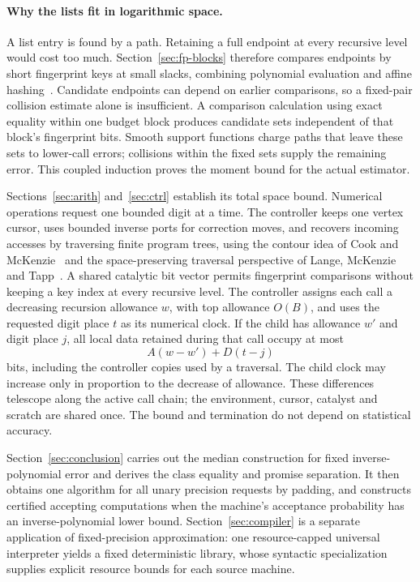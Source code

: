 \paragraph{Why the lists fit in logarithmic space.}
A list entry is found by a path.  Retaining a full endpoint at every
recursive level would cost too much.  Section~\ref{sec:fp-blocks}
therefore compares endpoints by short fingerprint keys at small slacks,
combining polynomial
evaluation and affine hashing~\cite{Schwartz1980,CarterWegman1979}.
Candidate endpoints
can depend on earlier comparisons, so a fixed-pair collision estimate
alone is insufficient.  A comparison calculation using exact equality
within one budget block produces candidate sets independent of that
block's fingerprint bits.  Smooth support functions charge paths that
leave these sets to lower-call errors; collisions within the fixed sets
supply the remaining error.  This coupled induction proves the moment
bound for the actual estimator.

Sections~\ref{sec:arith} and~\ref{sec:ctrl} establish its total space
bound.  Numerical operations request one bounded digit at a time.
The controller keeps one vertex cursor, uses bounded inverse ports for
correction moves, and recovers incoming accesses by traversing finite
program trees, using the contour idea of Cook and
McKenzie~\cite{CookMcKenzie1987} and the space-preserving traversal
perspective of Lange, McKenzie and Tapp~\cite{LMT2000}.  A shared catalytic bit vector permits fingerprint
comparisons without keeping a key index at every recursive level.
The controller assigns each call a decreasing recursion allowance $w$,
with top allowance $O(B)$, and uses the requested digit place $t$ as its
numerical clock.  If the child has allowance $w'$ and digit place $j$,
all local data retained during that call occupy at most
\[
                         A(w-w')+D(t-j)
\]
bits, including the controller copies used by a traversal.  The child
clock may increase only in proportion to the decrease of allowance.
These differences telescope along the active call chain; the environment,
cursor, catalyst and scratch are shared once.  The bound and termination
do not depend on statistical accuracy.

Section~\ref{sec:conclusion} carries out the median construction for
fixed inverse-polynomial error and derives the class equality and
promise separation.  It then obtains one algorithm for all unary
precision requests by padding, and constructs certified accepting
computations when the machine's acceptance probability has an
inverse-polynomial lower bound.
Section~\ref{sec:compiler} is a separate application of fixed-precision
approximation: one resource-capped universal interpreter yields a fixed
deterministic library, whose syntactic specialization supplies explicit
resource bounds for each source machine.
